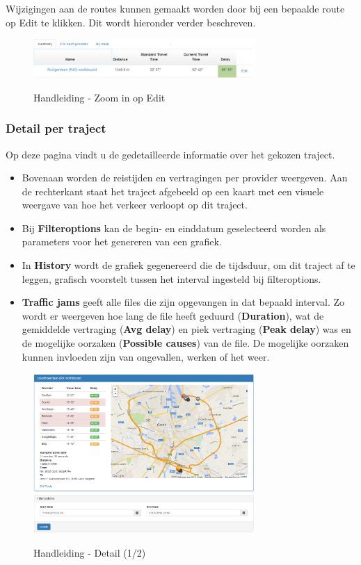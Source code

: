 Wijzigingen aan de routes kunnen gemaakt worden door bij een bepaalde route op Edit te klikken. Dit wordt hieronder verder beschreven.

\begin{figure}[H]
\centering
\includegraphics[width=0.75\textwidth]{images/edit.png}\\
\caption{Handleiding - Zoom in op Edit}
\end{figure}

\subsubsection{Detail per traject}

Op deze pagina vindt u de gedetailleerde informatie over het gekozen traject. 

\begin{itemize} 
\item Bovenaan worden de reistijden en vertragingen per provider weergeven. Aan de rechterkant staat het traject afgebeeld op een kaart met een visuele weergave van hoe het verkeer verloopt op dit traject.
\item Bij \textbf{Filteroptions} kan de begin- en einddatum geselecteerd worden als parameters voor het genereren van een grafiek. 
\item In \textbf{History} wordt de grafiek gegenereerd die de tijdsduur, om dit traject af te leggen, grafisch voorstelt tussen het interval ingesteld bij filteroptions.
\item \textbf{Traffic jams} geeft alle files die zijn opgevangen in dat bepaald interval. Zo wordt er weergeven hoe lang de file heeft geduurd (\textbf{Duration}), wat de gemiddelde vertraging (\textbf{Avg delay}) en piek vertraging (\textbf{Peak delay}) was en de mogelijke oorzaken (\textbf{Possible causes}) van de file. De mogelijke oorzaken kunnen invloeden zijn van ongevallen, werken of het weer.
\end{itemize}

\begin{figure}[H]
\centering
\includegraphics[width=0.75\textwidth]{images/detail.png}\\
\caption{Handleiding - Detail (1/2)}
\end{figure}


